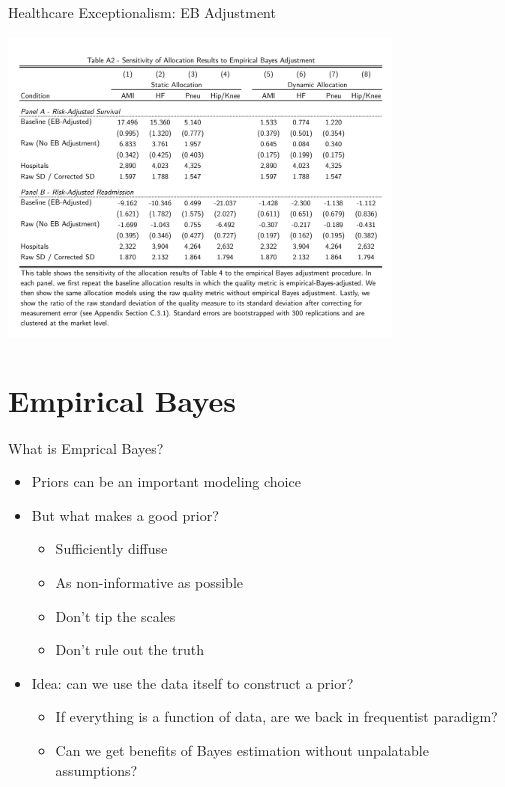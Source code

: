\documentclass[xcolor=pdftex,dvipsnames,table,mathserif,aspectratio=169]{beamer}
\begin{document}
\begin{frame}{Healthcare Exceptionalism: EB Adjustment}
\begin{center}
\includegraphics[width=4in]{./resources/hc_a2.png}
\end{center}
\end{frame}



\section{Empirical Bayes}
\begin{frame}{What is Emprical Bayes?}
\begin{itemize}
\item Priors can be an important modeling choice
\item But what makes a good prior?
\begin{itemize}
\item Sufficiently diffuse
\item As non-informative as possible
\item Don't tip the scales
\item Don't rule out the truth
\end{itemize}
\item Idea: can we use the data itself to construct a prior?
\begin{itemize}
\item If everything is a function of data, are we back in frequentist paradigm?
\item Can we get benefits of Bayes estimation without unpalatable assumptions?
\end{itemize}
\end{itemize}
\end{frame}
\end{document}
